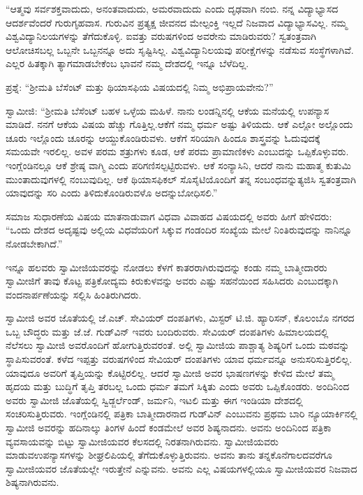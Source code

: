 \vskip 0.1cm

“ಆತ್ಮವು ಸರ್ವಶಕ್ತವಾದುದು, ಅನಂತವಾದುದು, ಅಮರವಾದುದು ಎಂದು ದೃಢವಾಗಿ ನಂಬಿ. ನನ್ನ ವಿದ್ಯಾಭ್ಯಾಸದ ಆದರ್ಶವೆಂದರೆ ಗುರುಗೃಹವಾಸ. ಗುರುವಿನ ಪ್ರತ್ಯಕ್ಷ ಜೀವನದ ಮೇಲ್ಪಂಕ್ತಿ ಇಲ್ಲದೆ ನಿಜವಾದ ವಿದ್ಯಾಭ್ಯಾಸವಿಲ್ಲ. ನಮ್ಮ ವಿಶ್ವವಿದ್ಯಾನಿಲಯಗಳನ್ನು ತೆಗೆದುಕೊಳ್ಳಿ. ಐವತ್ತು ವರುಷಗಳಿಂದ ಅವರೇನು ಮಾಡಿರುವರು? ಸ್ವತಂತ್ರವಾಗಿ ಆಲೋಚಿಸಬಲ್ಲ ಒಬ್ಬನೇ ಒಬ್ಬನನ್ನೂ ಅದು ಸೃಷ್ಟಿಸಿಲ್ಲ. ವಿಶ್ವವಿದ್ಯಾನಿಲಯವು ಪರೀಕ್ಷೆಗಳನ್ನು ನಡೆಸುವ ಸಂಸ್ಥೆಗಳಾಗಿವೆ. ಎಲ್ಲರ ಹಿತಕ್ಕಾಗಿ ತ್ಯಾಗಮಾಡಬೇಕೆಂಬ ಭಾವನೆ ನಮ್ಮ ದೇಶದಲ್ಲಿ ಇನ್ನೂ ಬೆಳೆದಿಲ್ಲ.

\vskip 0.1cm

ಪ್ರಶ್ನೆ: “ಶ‍್ರೀಮತಿ ಬೆಸೆಂಟ್​ ಮತ್ತು ಥಿಯಾಸಫಿಯ ವಿಷಯದಲ್ಲಿ ನಿಮ್ಮ ಅಭಿಪ್ರಾಯ\-ವೇನು?”

\vskip 0.1cm

ಸ್ವಾಮೀಜಿ: “ಶ‍್ರೀಮತಿ ಬೆಸೆಂಟ್​ ಬಹಳ ಒಳ್ಳೆಯ ಮಹಿಳೆ. ನಾನು ಲಂಡನ್ನಿನಲ್ಲಿ ಆಕೆಯ ಮನೆಯಲ್ಲಿ ಉಪನ್ಯಾಸ ಮಾಡಿದೆ. ನನಗೆ ಆಕೆಯ ವಿಷಯ ಹೆಚ್ಚು ಗೊತ್ತಿಲ್ಲ.\break ಆಕೆಗೆ ನಮ್ಮ ಧರ್ಮ ಅಷ್ಟು ತಿಳಿಯದು. ಆಕೆ ಎಲ್ಲೋ ಅಲ್ಲೊಂದು ಚೂರು ಇಲ್ಲೊಂದು ಚೂರನ್ನು ಆಯ್ದುಕೊಂಡಿರುವಳು. ಆಕೆಗೆ ಸರಿಯಾಗಿ ಹಿಂದೂ ಶಾಸ್ತ್ರವನ್ನು ಓದುವುದಕ್ಕೆ ಸಮಯವೇ ಇರಲಿಲ್ಲ. ಅವಳ ಪರಮ ಶತ್ರುಗಳು ಕೂಡ, ಆಕೆ ಪರಮ ಪ್ರಾಮಾಣಿಕಳು ಎಂಬುದನ್ನು ಒಪ್ಪಿಕೊಳ್ಳುವರು. ಇಂಗ್ಲೆಂಡಿನಲ್ಲೂ ಆಕೆ ಶ್ರೇಷ್ಠ ವಾಗ್ಮಿ ಎಂದು ಪರಿಗಣಿಸಲ್ಪಟ್ಟಿರುವಳು. ಆಕೆ ಸಂನ್ಯಾಸಿನಿ, ಆದರೆ ನಾನು ಮಹಾತ್ಮ ಕುತುಮಿ ಮುಂತಾದುವುಗಳಲ್ಲಿ ನಂಬುವುದಿಲ್ಲ. ಆಕೆ ಥಿಯಾಸಫಿಕಲ್​ ಸೊಸೈಟಿಯೊಂದಿಗೆ ತನ್ನ ಸಂಬಂಧವನ್ನು\break ತ್ಯಜಿಸಿ ಸ್ವತಂತ್ರವಾಗಿ ಯಾವುದನ್ನು ಸರಿ ಎಂದು ತಿಳಿದುಕೊಂಡಿರುವಳೊ ಅದನ್ನು\break ಬೋಧಿಸಲಿ.”

\vskip 0.1cm

ಸಮಾಜ ಸುಧಾರಣೆಯ ವಿಷಯ ಮಾತನಾಡುವಾಗ ವಿಧವಾ ವಿವಾಹದ ವಿಷಯದಲ್ಲಿ ಅವರು ಹೀಗೆ ಹೇಳಿದರು: “ಒಂದು ದೇಶದ ಅದೃಷ್ಟವು ಅಲ್ಲಿಯ ವಿಧವೆಯರಿಗೆ ಸಿಕ್ಕುವ ಗಂಡಂದಿರ ಸಂಖ್ಯೆಯ ಮೇಲೆ ನಿಂತಿರುವುದನ್ನು ನಾನಿನ್ನೂ ನೋಡಬೇಕಾಗಿದೆ.”

\vskip 0.1cm

ಇನ್ನೂ ಹಲವರು ಸ್ವಾಮೀಜಿಯವರನ್ನು ನೋಡಲು ಕೆಳಗೆ ಕಾತರರಾಗಿರುವುದನ್ನು ಕಂಡು ನಮ್ಮ ಬಾತ್ಮೀದಾರರು ಸ್ವಾಮೀಜಿಗೆ ತಾವು ಕೊಟ್ಟ ಪತ್ರಿಕೋದ್ಯಮ ಕಿರುಕುಳವನ್ನು ಅವರು ಎಷ್ಟು ಸಹನೆಯಿಂದ ಸಹಿಸಿದರು ಎಂಬುದಕ್ಕಾಗಿ ವಂದನಾರ್ಪಣೆಯನ್ನು ಸಲ್ಲಿಸಿ ಹಿಂತಿರುಗಿದರು.

\vskip 0.1cm

ಸ್ವಾಮೀಜಿ ಅವರ ಜೊತೆಯಲ್ಲಿ ಜೆ.ಎಚ್​. ಸೇವಿಯರ್​ ದಂಪತಿಗಳು, ಮಿಸ್ಟರ್​ ಟಿ.ಜಿ. ಹ್ಯಾರಿಸನ್​, ಕೊಲಂಬೊ ನಗರದ ಒಬ್ಬ ಬೌದ್ಧರು ಮತ್ತು ಜೆ.ಜೆ. ಗುಡ್​ವಿನ್​ ಇವರು ಬಂದಿರುವರು. ಸೇವಿಯರ್​ ದಂಪತಿಗಳು ಹಿಮಾಲಯದಲ್ಲಿ ನೆಲೆಸಲು ಸ್ವಾಮೀಜಿ ಅವರೊಂದಿಗೆ ಹೋಗುತ್ತಿರುವರಂತೆ. ಅಲ್ಲಿ ಸ್ವಾಮೀಜಿಯ ಪಾಶ್ಚಾತ್ಯ ಶಿಷ್ಯರಿಗೆ ಒಂದು ಮಠವನ್ನು ಸ್ಥಾಪಿಸುವರಂತೆ. ಕಳೆದ ಇಪ್ಪತ್ತು ವರುಷಗಳಿಂದ ಸೇವಿಯರ್​ ದಂಪತಿಗಳು ಯಾವ ಧರ್ಮವನ್ನೂ ಅನುಸರಿಸುತ್ತಿರಲಿಲ್ಲ. ಯಾವುದೂ ಅವರಿಗೆ ತೃಪ್ತಿಯನ್ನು ಕೊಟ್ಟಿರಲಿಲ್ಲ. ಆದರೆ ಸ್ವಾಮೀಜಿ ಅವರ ಭಾಷಣಗಳನ್ನು ಕೇಳಿದ ಮೇಲೆ ತಮ್ಮ ಹೃದಯ ಮತ್ತು ಬುದ್ಧಿಗೆ ತೃಪ್ತಿ ತರಬಲ್ಲ ಒಂದು ಧರ್ಮ ತಮಗೆ ಸಿಕ್ಕಿತು ಎಂದು ಅವರು ಒಪ್ಪಿಕೊಂಡರು. ಅಂದಿನಿಂದ ಅವರು ಸ್ವಾಮೀಜಿ ಜೊತೆಯಲ್ಲಿ ಸ್ವಿಡ್ಜರ್ಲೆಂಡ್​, ಜರ್ಮನಿ, ಇಟಲಿ ಮತ್ತು ಈಗ ಇಂಡಿಯಾ ದೇಶದಲ್ಲಿ ಸಂಚರಿಸುತ್ತಿರುವರು. ಇಂಗ್ಲೆಂಡಿನಲ್ಲಿ ಪತ್ರಿಕಾ ಬಾತ್ಮೀದಾರನಾದ ಗುಡ್​ವಿನ್​ ಎಂಬುವನು ಪ್ರಥಮ ಬಾರಿ ನ್ಯೂಯಾರ್ಕಿನಲ್ಲಿ ಸ್ವಾಮೀಜಿ ಅವರನ್ನು ಹದಿನಾಲ್ಕು ತಿಂಗಳ ಹಿಂದೆ ಕಂಡಮೇಲೆ ಅವರ ಶಿಷ್ಯನಾದನು. ಅವನು ಅಂದಿನಿಂದ ಪತ್ರಿಕಾ ವ್ಯವಸಾಯವನ್ನು ಬಿಟ್ಟು ಸ್ವಾಮೀಜಿಯವರ ಕೆಲಸದಲ್ಲಿ ನಿರತನಾಗಿರುವನು. ಸ್ವಾಮೀಜಿಯವರು ಮಾಡುವ\break ಉಪನ್ಯಾಸಗಳನ್ನು ಶೀಘ್ರಲಿಪಿಯಲ್ಲಿ ತೆಗೆದುಕೊಳ್ಳುತ್ತಿರುವನು. ಅವನು ತಾನು ತನ್ನ\break ಕೊನೆಗಾಲದವರೆಗೂ ಸ್ವಾಮೀಜಿಯವರ ಜೊತೆಯಲ್ಲೇ ಇರುತ್ತೇನೆ ಎನ್ನುವನು. ಅವನು ಎಲ್ಲ ವಿಷಯಗಳಲ್ಲಿಯೂ ಸ್ವಾಮೀಜಿಯವರ ನಿಜವಾದ ಶಿಷ್ಯನಾಗಿರುವನು.

